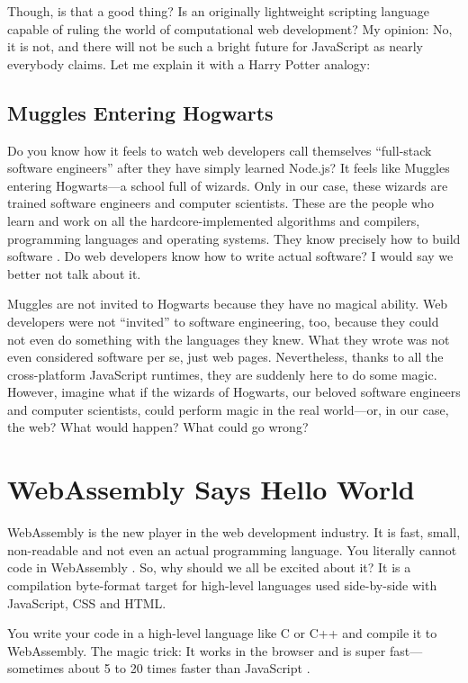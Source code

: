\documentclass[10pt]{article}
\begin{document}
\begin{sloppypar}
  Though, is that a good thing? Is an originally lightweight scripting language capable of ruling the world of computational web development? My opinion: No, it is not, and there will not be such a bright future for JavaScript as nearly everybody claims. Let me explain it with a Harry Potter analogy:

  \subsection{Muggles Entering Hogwarts}
  \label{sec:muggles}

  Do you know how it feels to watch web developers call themselves “full-stack software engineers” after they have simply learned Node.js? It feels like Muggles entering Hogwarts—a school full of wizards. Only in our case, these wizards are trained software engineers and computer scientists. These are the people who learn and work on all the hardcore-implemented algorithms and compilers, programming languages and operating systems. They know precisely how to build software \citep{might_what_2011}. Do web developers know how to write actual software? I would say we better not talk about it.

  Muggles are not invited to Hogwarts because they have no magical ability. Web developers were not “invited” to software engineering, too, because they could not even do something with the languages they knew. What they wrote was not even considered software per se, just web pages. Nevertheless, thanks to all the cross-platform JavaScript runtimes, they are suddenly here to do some magic. However, imagine what if the wizards of Hogwarts, our beloved software engineers and computer scientists, could perform magic in the real world—or, in our case, the web? What would happen? What could go wrong?

  \section{WebAssembly Says Hello World}
  \label{sec:hello-world}

  WebAssembly is the new player in the web development industry. It is fast, small, non-readable and not even an actual programming language. You literally cannot code in WebAssembly \citep{rourke_learn_2018}. So, why should we all be excited about it? It is a compilation byte-format target for high-level languages used side-by-side with JavaScript, CSS and HTML.

  You write your code in a high-level language like C or C++ and compile it to WebAssembly. The magic trick: It works in the browser and is super fast—sometimes about 5 to 20 times faster than JavaScript \citep{aboukhalil_how_2019}.


\end{sloppypar}
\end{document}
